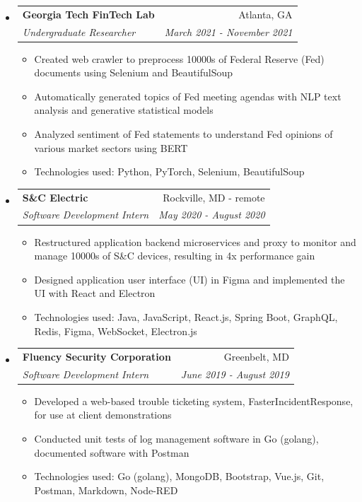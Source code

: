 \documentclass[letterpaper,10pt]{article}
\makeatletter
\newcommand{\resitem}[1]{\item #1 \vspace{-3.5pt}}  %
\newcommand{\ressubheading}[4]{
\begin{tabular*}{7.0in}{l@{\extracolsep{\fill}}r}  
		\textbf{#1} & #2 \\
		\textit{#3} & \textit{#4} \\
\end{tabular*}\vspace{-6pt}}  %
\makeatother
\begin{document}
\begin{itemize}
\begin{itemize}
        \resitem{Technologies used: TypeScript, React.js, Figma, IndexedDB, Workbox, Nest.js}
    \end{itemize}
\item
    \ressubheading{Georgia Tech FinTech Lab}{Atlanta, GA}{Undergraduate Researcher}{March 2021 - November 2021}
    \begin{itemize}
        \resitem{Created web crawler to preprocess 10000s of Federal Reserve (Fed) documents using Selenium and BeautifulSoup}
        \resitem{Automatically generated topics of Fed meeting agendas with NLP text analysis and generative statistical models}
        \resitem{Analyzed sentiment of Fed statements to understand Fed opinions of various market sectors using BERT}
        \resitem{Technologies used: Python, PyTorch, Selenium, BeautifulSoup}
    \end{itemize}
\item
    \ressubheading{S\&C Electric}{Rockville, MD - remote}{Software Development Intern}{May 2020 - August 2020}
    \begin{itemize}
        \resitem{Restructured application backend microservices and proxy to monitor and manage 10000s of S\&C devices, resulting in 4x performance gain}
        \resitem{Designed application user interface (UI) in Figma and implemented the UI with React and Electron}
        \resitem{Technologies used: Java, JavaScript, React.js, Spring Boot, GraphQL, Redis, Figma, WebSocket, Electron.js}
    \end{itemize}
\item
    \ressubheading{Fluency Security Corporation}{Greenbelt, MD}{Software Development Intern}{June 2019 - August 2019}
    \begin{itemize}
        \resitem{Developed a web-based trouble ticketing system, FasterIncidentResponse, for use at client demonstrations}
        \resitem{Conducted unit tests of log management software in Go (golang), documented software with Postman}
        \resitem{Technologies used: Go (golang), MongoDB, Bootstrap, Vue.js, Git, Postman, Markdown, Node-RED}
    \end{itemize}
\end{itemize}
\end{document}

